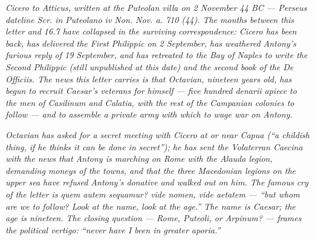 
\textit{Cicero to Atticus, written at the Puteolan villa on
2 November 44 BC --- Perseus dateline \textit{Scr. in
Puteolano iv Non. Nov. a. 710 (44)}. The months between this
letter and 16.7 have collapsed in the surviving
correspondence: Cicero has been back, has delivered the
First Philippic on 2 September, has weathered Antony's
furious reply of 19 September, and has retreated to the Bay
of Naples to write the Second Philippic (still unpublished
at this date) and the second book of the \textit{De
Officiis}. The news this letter carries is that Octavian,
nineteen years old, has begun to recruit Caesar's veterans
for himself --- five hundred denarii apiece to the men of
Casilinum and Calatia, with the rest of the Campanian
colonies to follow --- and to assemble a private army with
which to wage war on Antony.}

\textit{Octavian has asked for a secret meeting with Cicero
at or near Capua (``a childish thing, if he thinks it can be
done in secret''); he has sent the Volaterran Caecina with
the news that Antony is marching on Rome with the Alauda
legion, demanding moneys of the towns, and that the three
Macedonian legions on the upper sea have refused Antony's
donative and walked out on him. The famous cry of the letter
is \textit{quem autem sequamur? vide nomen, vide aetatem} ---
``but whom are we to follow? Look at the name, look at the
age.'' The name is Caesar; the age is nineteen. The closing
question --- Rome, Puteoli, or Arpinum? --- frames the
political vertigo: ``never have I been in greater
\textit{aporia}.''}
